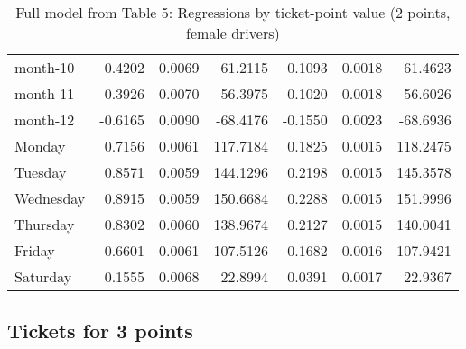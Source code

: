 \documentclass[10pt]{article}
\begin{document}
\begin{table}[ht]
\begin{tabular}{lrrrrrr}
  month-10 & 0.4202 & 0.0069 & 61.2115 & 0.1093 & 0.0018 & 61.4623 \\ 
  month-11 & 0.3926 & 0.0070 & 56.3975 & 0.1020 & 0.0018 & 56.6026 \\ 
  month-12 & -0.6165 & 0.0090 & -68.4176 & -0.1550 & 0.0023 & -68.6936 \\ 
  Monday & 0.7156 & 0.0061 & 117.7184 & 0.1825 & 0.0015 & 118.2475 \\ 
  Tuesday & 0.8571 & 0.0059 & 144.1296 & 0.2198 & 0.0015 & 145.3578 \\ 
  Wednesday & 0.8915 & 0.0059 & 150.6684 & 0.2288 & 0.0015 & 151.9996 \\ 
  Thursday & 0.8302 & 0.0060 & 138.9674 & 0.2127 & 0.0015 & 140.0041 \\ 
  Friday & 0.6601 & 0.0061 & 107.5126 & 0.1682 & 0.0016 & 107.9421 \\ 
  Saturday & 0.1555 & 0.0068 & 22.8994 & 0.0391 & 0.0017 & 22.9367 \\ 
   \hline
\end{tabular}
\caption{Full model from Table 5: Regressions by ticket-point value (2 points, female drivers)} 
\label{tab_5_2_pts_no_age_F}
\end{table}


\clearpage
\pagebreak




\subsection{Tickets for 3 points}



\end{document}
